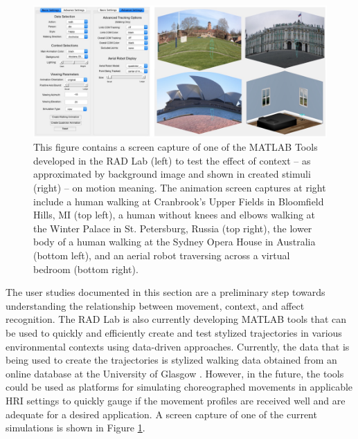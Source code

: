 \documentclass[arts,article,submit,moreauthors,pdftex,10pt,a4paper]{mdpi}
\begin{document}
\begin{figure}[h!]
\centering
\vspace{-.1in}
\includegraphics[width=.95\columnwidth]{madi3.png}
\caption{This figure contains a screen capture of one of the MATLAB Tools developed in the RAD Lab (left) to test the effect of context -- as approximated by background image and shown in created stimuli (right) -- on motion meaning.  The animation screen captures at right include a human walking at Cranbrook’s Upper Fields in Bloomfield Hills, MI (top left), a human without knees and elbows walking at the Winter Palace in St. Petersburg, Russia (top right), the lower body of a human walking at the Sydney Opera House in Australia (bottom left), and an aerial robot traversing across a virtual bedroom (bottom right).}
\label{madi2}
\end{figure}


The user studies documented in this section are a preliminary step towards understanding the relationship between movement, context, and affect recognition. The RAD Lab is also currently developing MATLAB tools that can be used to quickly and efficiently create and test stylized trajectories in various environmental contexts using data-driven approaches. Currently, the data that is being used to create the trajectories is stylized walking data obtained from an online database at the University of Glasgow \cite{ma2006motion}. However, in the future, the tools could be used as platforms for simulating choreographed movements in applicable HRI settings to quickly gauge if the movement profiles are received well and are adequate for a desired application. A screen capture of one of the current simulations is shown in Figure \ref{madi2}.
\end{document}
